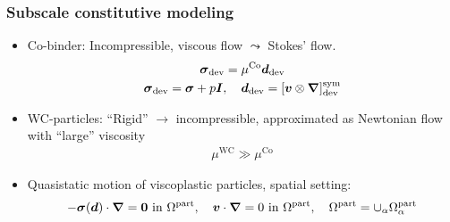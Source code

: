 \documentclass[11pt]{beamer} %
\newcommand{\particle}{\mathrm{part}}
\renewcommand{\alert}[1]{\textbf{#1}}
\begin{document}
\begin{frame}
 \frametitle{Subscale constitutive modeling}
 \begin{itemize}
  \item Co-binder: Incompressible, viscous flow $\leadsto$ Stokes' flow.
  \begin{gather*}
   \boldsymbol{\sigma}_{\mathrm{dev}} = \mu^{\mathrm{Co}} {\boldsymbol{d}}_{\mathrm{dev}}\\
   \boldsymbol{\sigma}_{\mathrm{dev}} = \boldsymbol{\sigma} + p\boldsymbol{I},\quad \boldsymbol{d}_{\mathrm{dev}} = [\boldsymbol{v}\mathbin{\otimes} \boldsymbol{\nabla}]_{\mathrm{dev}}^{\mathrm{sym}}
  \end{gather*}
  \item WC-particles: ``Rigid'' $\to$ incompressible, approximated as Newtonian flow with ``large'' viscosity
  \begin{align*}
   \mu^{\mathrm{WC}} \gg \mu^{\mathrm{Co}}
  \end{align*}
  \item Quasistatic motion of viscoplastic particles, spatial setting:
  \begin{align*}
   -\ts\sigma(\ts d)\cdot\ta\nabla = \ta 0 \text{ in } \Omega^\particle,\quad \ta v\cdot\ta\nabla = 0 \text{ in } \Omega^\particle,\quad \Omega^\particle = \cup_\alpha \Omega_\alpha^\particle
  \end{align*}
 \end{itemize}
\end{frame}
\end{document}
